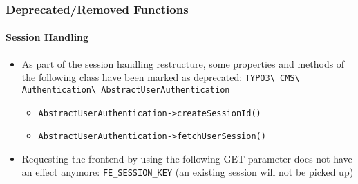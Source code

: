 %

\begin{frame}[fragile]
	\frametitle{Deprecated/Removed Functions}
	\framesubtitle{Session Handling}

	\begin{itemize}
		\item As part of the session handling restructure, some properties and methods
			of the following class have been marked as deprecated:\newline
			\vspace{0.2cm}
			\smaller\texttt{TYPO3\textbackslash
				CMS\textbackslash
				Authentication\textbackslash
				AbstractUserAuthentication}\normalsize

			\begin{itemize}\small
				\item \texttt{AbstractUserAuthentication->createSessionId()}
				\item \texttt{AbstractUserAuthentication->fetchUserSession()}
			\end{itemize}\normalsize

		\item Requesting the frontend by using the following GET parameter does
			not have an effect anymore: \small\texttt{FE\_SESSION\_KEY}\normalsize\newline
			\smaller(an existing session will not be picked up)\normalsize

	\end{itemize}

\end{frame}


